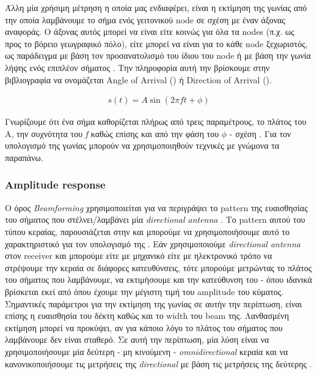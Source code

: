 Άλλη μία χρήσιμη μέτρηση η οποία μας ενδιαφέρει, είναι η εκτίμηση της γωνίας από την οποία λαμβάνουμε το σήμα ενός γειτονικού
node σε σχέση με έναν άξονας αναφοράς. Ο άξονας αυτός μπορεί να είναι είτε κοινώς για όλα τα nodes (π.χ. ως προς το βόρειο γεωγραφικό πόλο),
είτε μπορεί να είναι για το κάθε node ξεχωριστός, ως παράδειγμα με βάση τον προσανατολισμό του ίδιου του node ή με βάση την γωνία λήψης ενός 
επιπλέον σήματος \cite{wsn-Localization-systems}. Την πληροφορία αυτή την βρίσκουμε στην βιβλιογραφία να ονομάζεται Angle of Arrival 
() ή Direction of Arrival (). 

\begin{align}
	s(t)=A\sin(2\pi ft + \phi) \label{eq:signal-equation}
\end{align}

Γνωρίζουμε ότι ένα σήμα καθορίζεται πλήρως από τρεις παραμέτρους, το πλάτος του A, την συχνότητα του \emph{f} καθώς 
επίσης και από την φάση του $\phi$ - σχέση . Για τον υπολογισμό της γωνίας  μπορούν 
να χρησιμοποιηθούν τεχνικές με γνώμονα τα παραπάνω. 

\subsubsection{Amplitude response}
Ο όρος \emph{Beamforming} \cite{wikipedia-beamforming} χρησιμοποιείται για να περιγράψει το pattern 
της ευαισθησίας του σήματος που στέλνει/λαμβάνει μία \emph{directional antenna} \cite{wikipedia-directionl-antenna}. 
Το pattern αυτού του τύπου κε\-ραί\-ας, παρουσιάζεται στην 
\cite{wsn-Localization-techniques} και μπορούμε να χρησιμοποιήσουμε αυτό το χαρακτηριστικό για τον υπολογισμό της . 
Εάν χρησιμοποιούμε \emph{directional ante\-nna} στον receiver και μπορούμε είτε με μηχανικό είτε με ηλεκτρονικό τρόπο να στρέψουμε
την κεραία σε διάφορες κατευθύνσεις, τότε μπορούμε μετρώντας το πλάτος του σήματος που λαμβάνουμε, να εκτιμήσουμε και την κατεύθυνση του - όπου ιδανικά
βρίσκεται εκεί από όπου έχουμε την μέγιστη τιμή του amplitude του κύματος. Σημαντικές παράμετροι για την εκτίμηση της γωνίας σε αυτήν την περίπτωση, 
είναι επίσης η ευαισθησία του δέκτη καθώς και το width του beam της. 
Λανθασμένη εκτίμηση μπορεί να προκύψει, αν για κάποιο λόγο το πλάτος του σήματος που λαμβάνουμε δεν είναι σταθερό. Σε αυτή την περίπτωση, μία λύση
είναι να χρησιμοποιήσουμε μία δεύτερη - μη κινούμενη - \emph{omnidirectional} κεραία και να κανονικοποιήσουμε τις μετρήσεις της \emph{directional} με βάση τις   
μετρήσεις της δεύτερης \cite{wsn-Localization-techniques}.

